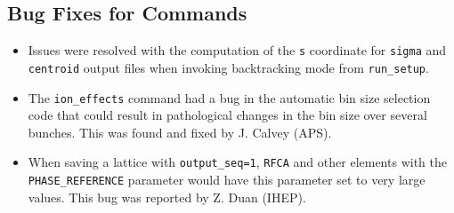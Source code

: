 \documentclass[11pt]{article}
\begin{document}
\subsection{Bug Fixes for Commands}
\begin{itemize}
\item Issues were resolved with the computation of the \verb|s| coordinate for \verb|sigma| and \verb|centroid|
  output files when invoking backtracking mode from \verb|run_setup|.
\item The \verb|ion_effects| command had a bug in the automatic bin size selection code that could result in pathological changes in the
  bin size over several bunches. This was found and fixed by J. Calvey (APS).
\item When saving a lattice with \verb|output_seq=1|, \verb|RFCA| and other elements with the \verb|PHASE_REFERENCE| parameter
  would have this parameter set to very large values. This bug was reported by Z. Duan (IHEP).
\end{itemize}
\end{document}
